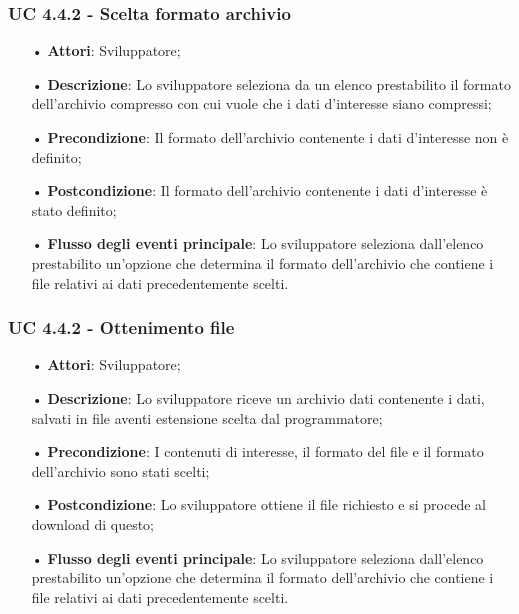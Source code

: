 \subsubsection{UC 4.4.2 - Scelta formato archivio}
\begin{itemize}
\item[•]\textbf{Attori}: Sviluppatore;
\item[•]\textbf{Descrizione}: Lo sviluppatore seleziona da un elenco prestabilito il formato dell'archivio compresso con cui vuole che i dati d'interesse siano compressi;
\item[•]\textbf{Precondizione}: Il formato dell'archivio contenente i dati d'interesse non è definito;
\item[•]\textbf{Postcondizione}: Il formato dell'archivio contenente i dati d'interesse è stato definito;
\item[•]\textbf{Flusso degli eventi principale}:  Lo sviluppatore seleziona dall'elenco prestabilito un'opzione che determina il formato dell'archivio che contiene i file relativi ai dati precedentemente scelti.
\end{itemize}

\subsubsection{UC 4.4.2 - Ottenimento file}
\begin{itemize}
\item[•]\textbf{Attori}: Sviluppatore;
\item[•]\textbf{Descrizione}: Lo sviluppatore riceve un archivio dati contenente i dati, salvati in file aventi estensione scelta dal programmatore;
\item[•]\textbf{Precondizione}: I contenuti di interesse, il formato del file e il formato dell'archivio sono stati scelti;
\item[•]\textbf{Postcondizione}: Lo sviluppatore ottiene il file richiesto e si procede al download di questo;
\item[•]\textbf{Flusso degli eventi principale}:  Lo sviluppatore seleziona dall'elenco prestabilito un'opzione che determina il formato dell'archivio che contiene i file relativi ai dati precedentemente scelti.
\end{itemize}


